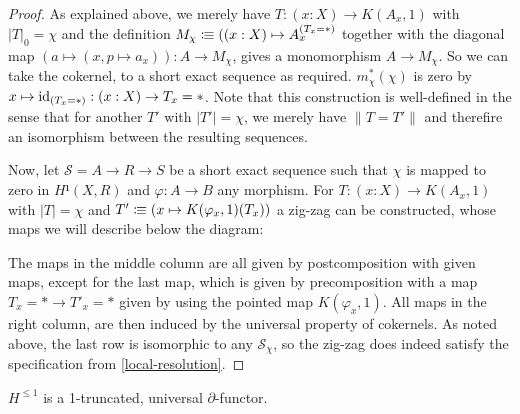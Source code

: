 \begin{proof}
  As explained above, we merely have $T:(x:X)\to K(A_x,1)$ with $|T|_0=\chi$ and the definition
  $M_\chi\vcentcolon\mspace{-1.2mu}\equiv ((x:X)\mapsto A_x^{(T_x=\ast)}$ together with the diagonal map $(a\mapsto (x, p\mapsto a_x)):A\to M_\chi$,
  gives a monomorphism $A\to M_\chi$.
  So we can take the cokernel, to a short exact sequence as required.
  $m_\chi^\ast(\chi)$ is zero by $x\mapsto \mathrm{id}_{(T_x=\ast)}:(x:X)\to T_x=\ast$.
  Note that this construction is well-defined in the sense that
  for another $T'$ with $|T'|=\chi$, we merely have $\|T=T'\|$ and therefire an isomorphism between the resulting sequences.

  Now, let $\mathcal{S}=A\to R\to S$ be a short exact sequence
  such that $\chi$ is mapped to zero in $H¹(X,R)$ and $\varphi:A\to B$ any morphism.
  For $T:(x:X)\to K(A_x,1)$ with $|T|=\chi$ and $T'\vcentcolon\mspace{-1.2mu}\equiv (x\mapsto K(\varphi_x,1)(T_x))$ 
  a zig-zag can be constructed,
  whose maps we will describe below the diagram: 
  \begin{center}
  \end{center}
  The maps in the middle column are all given by postcomposition with given maps,
  except for the last map, which is given by precomposition with a map
  $T_x=\ast\to T'_x=\ast$ given by using the pointed map $K(\varphi_x,1)$.
  All maps in the right column, are then induced by the universal property of cokernels.
  As noted above, the last row is isomorphic to any $\mathcal{S}_\chi$,
  so the zig-zag does indeed satisfy the specification from \cref{local-resolution}.
\end{proof}

\begin{theorem}
  $H^{\leq 1}$ is a 1-truncated, universal $\partial$-functor.
\end{theorem}

